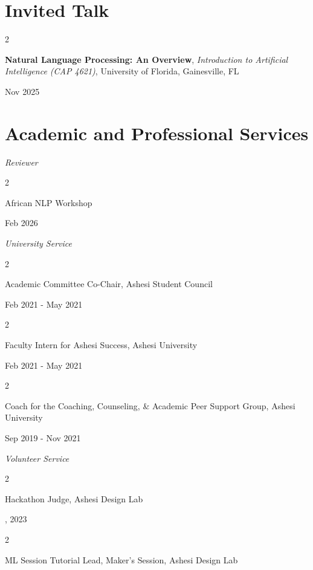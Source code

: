 \documentclass[10pt, letterpaper]{article}
\newenvironment{twocolentry}[2][]{
    \onecolentry
    \def\secondColumn{#2}
    \setcolumnwidth{\fill, 4.5 cm}
    \begin{paracol}{2}
}{
    \switchcolumn \raggedleft \secondColumn
    \end{paracol}
    \endonecolentry
} %
\begin{document}
    \section{Invited Talk}
    \begin{twocolentry}
        {Nov 2025}
        \textbf{Natural Language Processing: An Overview}, \textit{Introduction to Artificial Intelligence (CAP 4621)}, University of Florida, Gainesville, FL
    \end{twocolentry}

    \section{Academic and Professional Services}
    \large \textit{Reviewer}
    \normalsize
    \begin{twocolentry}

        {Feb 2026}
        African NLP Workshop
    \end{twocolentry}

    \vspace{0.2 cm}
    \large \textit{University Service}
     \normalsize
    \begin{twocolentry}
        {Feb 2021 - May 2021}
        Academic Committee Co-Chair, Ashesi Student Council
    \end{twocolentry}
    \vspace{0.1 cm}

    \begin{twocolentry}
        {Feb 2021 - May 2021}
        Faculty Intern for Ashesi Success, Ashesi University
    \end{twocolentry}
    \vspace{0.1 cm}

    \begin{twocolentry}
        {Sep 2019 - Nov 2021}
        Coach for the Coaching, Counseling, \& Academic Peer Support Group, Ashesi University
    \end{twocolentry}


    \vspace{0.2 cm}
    \large \textit{Volunteer Service}
     \normalsize
    \begin{twocolentry}
        {2022, 2023}
        Hackathon Judge, Ashesi Design Lab
    \end{twocolentry}
    \vspace{0.1 cm}

    \begin{twocolentry}
        {2023}
        ML Session Tutorial Lead, Maker's Session, Ashesi Design Lab
    \end{twocolentry}
    \vspace{0.1 cm}
\end{document}
